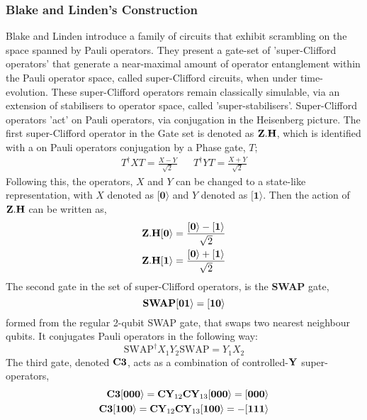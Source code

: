 \subsubsection{Blake and Linden's Construction}
Blake and Linden introduce a family of circuits that exhibit scrambling on the space spanned by Pauli operators.
They present a gate-set of 'super-Clifford operators' that generate a near-maximal amount of operator entanglement
within the Pauli operator space, called super-Clifford circuits, when under time-evolution. These super-Clifford operators
remain classically simulable, via an extension of stabilisers to operator space, called 'super-stabilisers'.
Super-Clifford operators 'act' on Pauli operators, via conjugation in the Heisenberg picture.
The first super-Clifford operator in the Gate set is denoted as ${\bf Z.H}$, which is identified with a on Pauli operators
conjugation by a Phase gate, $T$;
\begin{align}\label{phasegate}
    T^{\dagger} X T = \frac{X - Y}{\sqrt{2}} &  & T^{\dagger} Y T = \frac{X + Y}{\sqrt{2}}
\end{align}
Following this, the operators, $X$ and $Y$ can be changed to a state-like representation, with
$X$ denoted as $[{\mathbf 0}\rangle$ and $Y$ denoted as $[{\mathbf 1}\rangle$. Then the action of $\bf Z.H$ 
can be written as,
\begin{align}
    {\bf Z.H}[{\bf 0}\rangle = \frac{[{\bf 0}\rangle - [{\bf 1}\rangle}{\sqrt{2}} \\
    {\bf Z.H}[{\bf 1}\rangle = \frac{[{\bf 0}\rangle + [{\bf 1}\rangle}{\sqrt{2}} 
\end{align}
The second gate in the set of super-Clifford operators, is the {\bf SWAP} gate,
\begin{equation}
    \text{\bf SWAP} [{\bf 01}\rangle = [{\bf 10}\rangle
\end{equation}
formed from the regular 2-qubit SWAP gate, that swaps two nearest neighbour qubits. It conjugates
Pauli operators in the following way:
\begin{equation}
    \text{SWAP}^{\dagger} X_1Y_2 \text{SWAP} = Y_1X_2
\end{equation}
The third gate, denoted $\bf C3$, acts as a combination of controlled-$\text{\bf Y}$ super-operators,
\begin{align}
    {\bf C3} [{\bf 000}\rangle=  {\bf CY}_{12}{\bf CY}_{13} [{\bf000}\rangle = [{\bf 000}\rangle \\
    {\bf C3} [{\bf 100}\rangle=  {\bf CY}_{12}{\bf CY}_{13} [{\bf100}\rangle = -[{\bf 111}\rangle
\end{align}
